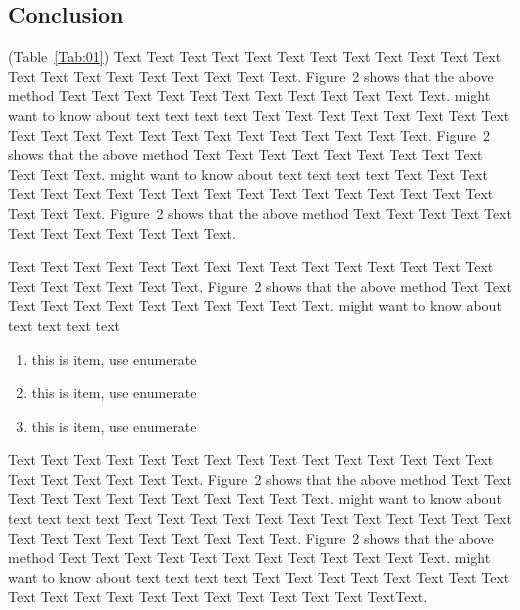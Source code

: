 \documentclass{bioinfo}
\begin{document}
\begin{methods}
\section{Conclusion}

(Table~\ref{Tab:01}) Text Text Text Text Text Text  Text Text Text
Text Text Text Text Text Text  Text Text Text Text Text Text.
Figure~2\vphantom{\ref{fig:02}} shows that the above method  Text
Text Text Text  Text Text Text Text Text Text  Text Text.
\citealp{Boffelli03} might want to know about  text text text text
Text Text Text Text Text Text  Text Text Text Text Text Text Text
Text Text  Text Text Text Text Text Text.
Figure~2\vphantom{\ref{fig:02}} shows that the above method  Text
Text Text Text  Text Text Text Text Text Text  Text Text.
\citealp{Boffelli03} might want to know about  text text text text
Text Text Text Text Text Text Text Text Text Text Text Text Text
Text Text  Text Text Text Text Text Text.
Figure~2\vphantom{\ref{fig:02}} shows that the above method  Text
Text Text Text  Text Text Text Text Text Text  Text Text.



Text Text Text Text Text Text  Text Text Text Text Text Text Text
Text Text  Text Text Text Text Text Text.
Figure~2\vphantom{\ref{fig:02}} shows that the above method  Text
Text Text Text  Text Text Text Text Text Text  Text Text.
\citealp{Boffelli03} might want to know about  text text text text

\begin{enumerate}
\item this is item, use enumerate
\item this is item, use enumerate
\item this is item, use enumerate
\end{enumerate}

Text Text Text Text Text Text Text Text Text Text Text Text Text
Text Text Text Text Text Text Text Text.
Figure~2\vphantom{\ref{fig:02}} shows\vadjust{\pagebreak} that the
above method  Text Text Text Text Text Text Text Text Text Text
Text Text.  \citealp{Boffelli03} might want to know about text
text text text Text Text Text Text Text Text  Text Text Text Text
Text Text Text Text Text Text Text Text Text Text Text.
Figure~2\vphantom{\ref{fig:02}} shows that the above method  Text
Text Text Text Text Text Text Text Text Text  Text Text.
\citealp{Boffelli03} might want to know about text text text text
Text Text Text Text Text Text  Text Text Text Text Text Text Text
Text Text Text Text Text Text Text\break Text.



\end{methods}
\end{document}
